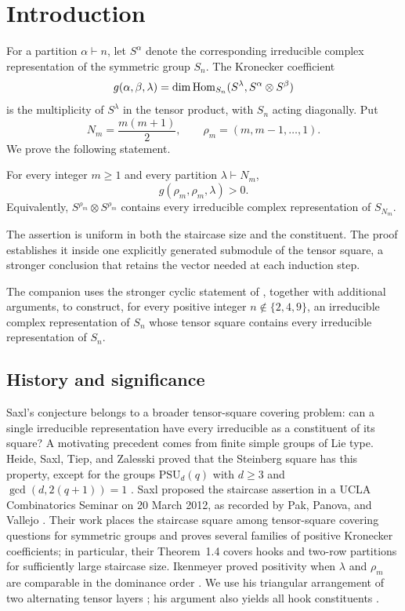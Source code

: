 \section{Introduction}
\label{sec:introduction}

For a partition $\alpha\vdash n$, let $S^\alpha$ denote the corresponding
irreducible complex representation of the symmetric group $S_n$.
The Kronecker coefficient
\[
g(\alpha,\beta,\lambda)
=\dim\operatorname{Hom}_{S_n}(S^\lambda,S^\alpha\otimes S^\beta)
\]
is the multiplicity of $S^\lambda$ in the tensor product, with $S_n$
acting diagonally. Put
\begin{equation}\label{intro:staircase}
N_m=\frac{m(m+1)}2,\qquad \rho_m=(m,m-1,\ldots,1).
\end{equation}
We prove the following statement.

\begin{theorem}\label{thm:saxl}
For every integer $m\ge1$ and every partition $\lambda\vdash N_m$,
\[
g(\rho_m,\rho_m,\lambda)>0.
\]
Equivalently, $S^{\rho_m}\otimes S^{\rho_m}$ contains every irreducible
complex representation of $S_{N_m}$.
\end{theorem}

The assertion is uniform in both the staircase size and the constituent.
The proof establishes it inside one explicitly generated submodule of
the tensor square, a stronger conclusion that retains the vector needed
at each induction step.

The companion \cite[Theorem~1.1]{universaltensorsquares2026} uses the
stronger cyclic statement of , together with
additional arguments, to construct, for every positive integer
$n\notin\{2,4,9\}$, an irreducible complex representation of $S_n$ whose
tensor square contains every irreducible representation of $S_n$.

\subsection{History and significance}

Saxl's conjecture belongs to a broader tensor-square covering problem:
can a single irreducible representation have every irreducible as a
constituent of its square? A motivating precedent comes from finite
simple groups of Lie type. Heide, Saxl, Tiep, and Zalesski proved that
the Steinberg square has this property, except for the groups
$\mathrm{PSU}_d(q)$ with $d\ge3$ and $\gcd(d,2(q+1))=1$
\cite[Theorem~1.2]{heidestz2013}.
Saxl proposed the staircase assertion in a UCLA Combinatorics Seminar on
20 March 2012, as recorded by Pak, Panova, and Vallejo
\cite[Conjecture~1.2 and Footnote~2]{pakpanovavallejo2016}.
Their work places the staircase square among tensor-square covering
questions for symmetric groups and proves several families of positive
Kronecker coefficients; in particular, their Theorem~1.4 covers hooks
and two-row partitions for sufficiently large staircase size.
Ikenmeyer proved positivity when $\lambda$ and $\rho_m$ are comparable
in the dominance order \cite[Theorem~2.1]{ikenmeyer2015}.
We use his triangular arrangement of two alternating tensor layers
\cite[Section~4]{ikenmeyer2015}; his argument also yields all hook constituents
\cite[Corollary~6.1]{ikenmeyer2015}.

